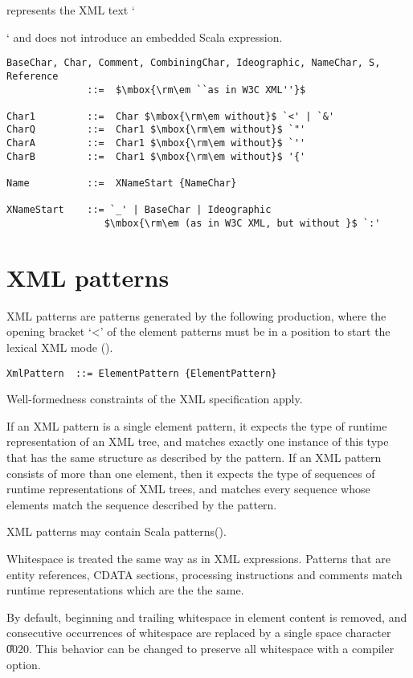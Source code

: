 represents the XML text `{` and does not introduce an embedded Scala 
expression.

\syntax\begin{lstlisting}
BaseChar, Char, Comment, CombiningChar, Ideographic, NameChar, S, Reference
              ::=  $\mbox{\rm\em ``as in W3C XML''}$

Char1         ::=  Char $\mbox{\rm\em without}$ `<' | `&'
CharQ         ::=  Char1 $\mbox{\rm\em without}$ `"'
CharA         ::=  Char1 $\mbox{\rm\em without}$ `''
CharB         ::=  Char1 $\mbox{\rm\em without}$ '{'

Name          ::=  XNameStart {NameChar}

XNameStart    ::= `_' | BaseChar | Ideographic 
                 $\mbox{\rm\em (as in W3C XML, but without }$ `:'

\end{lstlisting}
\section{XML patterns}\label{sec:xml-pats}
XML patterns are patterns generated by the following production, where
the opening bracket `<' of the element patterns must be in a position
to start the lexical XML mode ().

\syntax\begin{lstlisting}
XmlPattern  ::= ElementPattern {ElementPattern}
\end{lstlisting}
Well-formedness constraints of the XML specification apply.

If an XML pattern is a single element pattern, it expects the type of runtime
representation of an XML tree, and matches exactly one instance of this type
that has the same structure as described by the pattern. If an XML pattern 
consists of more than one element, then it expects the type of sequences
of runtime representations of XML trees, and matches every sequence whose 
elements match the sequence described by the pattern.

XML patterns may contain Scala patterns().

Whitespace is treated the same way as in XML expressions. Patterns 
that are entity references, CDATA sections, processing 
instructions and comments match runtime representations which are the
the same.

By default, beginning and trailing whitespace in element content is removed, 
and consecutive occurrences of whitespace are replaced by a single space
character \U{0020}. This behavior can be changed to preserve all whitespace
with a compiler option.

}
